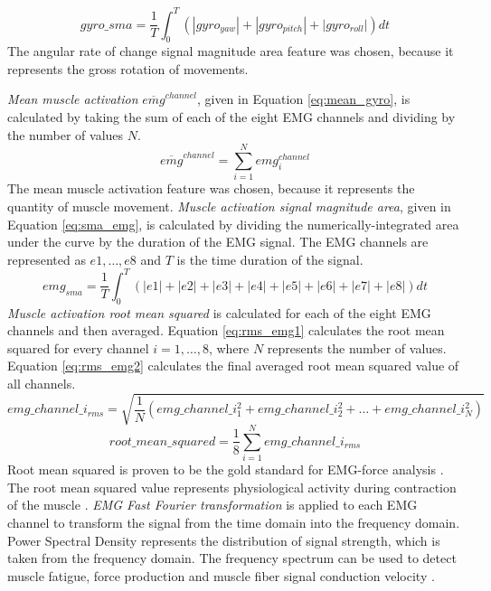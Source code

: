\begin{equation}\label{eq:sma_gyro}
gyro\_sma = \frac{1}{T}\int_{0}^{T}(|gyro_{yaw}|+|gyro_{pitch}|+|gyro_{roll}|)dt
\end{equation}
The angular rate of change signal magnitude area feature was chosen, because it represents the gross rotation of movements.
\par \emph{Mean muscle activation} $\overline{emg}^{channel}$, given in Equation \ref{eq:mean_gyro}, is calculated by taking the sum of each of the eight EMG channels and dividing by the number of values $N$.
\begin{equation}\label{eq:mean_emg}
\overline{emg}^{channel} = \sum_{i=1}^{N}emg^{channel}_i
\end{equation}
The mean muscle activation feature was chosen, because it represents the quantity of muscle movement.
\emph{Muscle activation signal magnitude area}, given in Equation \ref{eq:sma_emg}, is calculated by dividing the numerically-integrated area under the curve by the duration of the EMG signal. The EMG channels are represented as $e1,\dots,e8$ and $T$ is the time duration of the signal.
\begin{equation}\label{eq:sma_emg}
emg_{sma} = \frac{1}{T}\int_{0}^{T}(|e1|+|e2|+|e3|+|e4|+|e5|+|e6|+|e7|+|e8|)dt
\end{equation}
\emph{Muscle activation root mean squared} is calculated for each of the eight EMG channels and then averaged. Equation \ref{eq:rms_emg1} calculates the root mean squared for every channel $i=1,\dots,8$, where $N$ represents the number of values. Equation \ref{eq:rms_emg2} calculates the final averaged root mean squared value of all channels.
\begin{equation}\label{eq:rms_emg1}
emg\_channel\_i_{rms} = \sqrt{\frac{1}{N}(emg\_channel\_i_1^2+emg\_channel\_i_2^2+\dots+emg\_channel\_i_N^2)}
\end{equation}
\begin{equation}\label{eq:rms_emg2}
root\_mean\_squared = \frac{1}{8}\sum_{i=1}^{N}emg\_channel\_i_{rms}
\end{equation}
Root mean squared is proven to be the gold standard for EMG-force analysis \cite{KALLENBERG2008780}. The root mean squared value represents physiological activity during contraction of the muscle \cite{Totty2017}.
\emph{EMG Fast Fourier transformation} is applied to each EMG channel to transform the signal from the time domain into the frequency domain. Power Spectral Density represents the distribution of signal strength, which is taken from the frequency domain. The frequency spectrum can be used to detect muscle fatigue, force production and muscle fiber signal conduction velocity \cite{Gler2005}.
